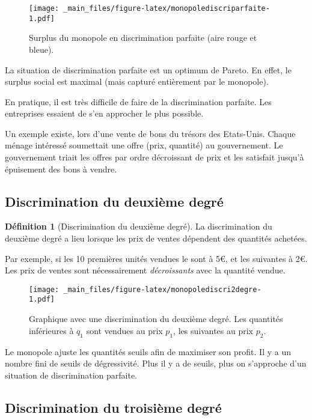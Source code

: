 \documentclass[
]{book}
\theoremstyle{definition}
\newtheorem{definition}{Définition}[chapter]
\theoremstyle{definition}
\theoremstyle{definition}
\theoremstyle{definition}
\theoremstyle{remark}
\begin{document}
\begin{figure}
\centering
\texttt{[image: \_main\_files/figure-latex/monopolediscriparfaite-1.pdf]}
\caption{\label{fig:monopolediscriparfaite}Surplus du monopole en discrimination parfaite (aire rouge et bleue).}
\end{figure}

La situation de discrimination parfaite est un optimum de Pareto.
En effet, le surplus social est maximal (mais capturé entièrement par le monopole).

En pratique, il est très difficile de faire de la discrimination parfaite.
Les entreprises essaient de s'en approcher le plus possible.

Un exemple existe, lors d'une vente de bons du trésors des Etats-Unis.
Chaque ménage intéressé soumettait une offre (prix, quantité) au gouvernement.
Le gouvernement triait les offres par ordre décroissant de prix et les satisfait jusqu'à épuisement des bons à vendre.

\hypertarget{discrimination-du-deuxiuxe8me-degruxe9}{%
\subsection{Discrimination du deuxième degré}\label{discrimination-du-deuxiuxe8me-degruxe9}}

\begin{definition}[Discrimination du deuxième degré]
La discrimination du deuxième degré a lieu lorsque les prix de ventes dépendent des quantités achetées.
\end{definition}

Par exemple, si les 10 premières unités vendues le sont à 5€, et les suivantes à 2€.
Les prix de ventes sont nécessairement \emph{décroissants} avec la quantité vendue.

\begin{figure}
\centering
\texttt{[image: \_main\_files/figure-latex/monopolediscri2degre-1.pdf]}
\caption{\label{fig:monopolediscri2degre}Graphique avec une discrimination du deuxième degré. Les quantités inférieures à \(q_1\) sont vendues au prix \(p_1\), les suivantes au prix \(p_2\).}
\end{figure}

Le monopole ajuste les quantités seuils afin de maximiser son profit.
Il y a un nombre fini de seuils de dégressivité.
Plus il y a de seuils, plus on s'approche d'un situation de discrimination parfaite.

\hypertarget{discrimination-du-troisiuxe8me-degruxe9}{%
\subsection{Discrimination du troisième degré}\label{discrimination-du-troisiuxe8me-degruxe9}}
\end{document}
